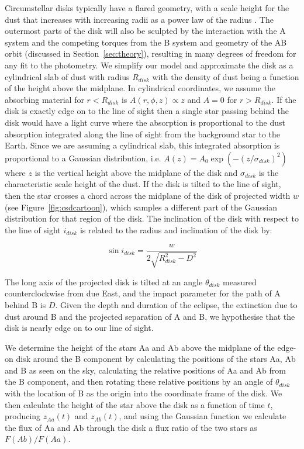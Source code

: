 \documentclass{aa}
\begin{document}
Circumstellar disks typically have a flared geometry, with a scale height for the dust that increases with increasing radii as a power law of the radius \citep{Dullemond02}.
%
The outermost parts of the disk will also be sculpted by the interaction with the A system and the competing torques from the B system and geometry of the AB orbit (discussed in Section~\ref{sec:theory}), resulting in many degrees of freedom for any fit to the photometry.
%
We simplify our model and approximate the disk as a cylindrical slab of dust with radius $R_{disk}$ with the density of dust being a function of the height above the midplane.
%
In cylindrical coordinates, we assume the absorbing material for $r<R_{disk}$ is $A(r,\phi,z)\propto z$ and $A=0$ for $r>R_{disk}$.
%
If the disk is exactly edge on to the line of sight then a single star passing behind the disk would have a light curve where the absorption is proportional to the dust absorption integrated along the line of sight from the background star to the Earth.
%
Since we are assuming a cylindrical slab, this integrated absorption is proportional to a Gaussian distribution, i.e. $A(z) = A_0 \exp(-(z/\sigma_{disk})^2)$ where $z$ is the vertical height above the midplane of the disk and $\sigma_{disk}$ is the characteristic scale height of the dust.
%
If the disk is tilted to the line of sight, then the star crosses a chord across the midplane of the disk of projected width $w$ (see Figure~\ref{fig:csdcartoon}), which samples a different part of the Gaussian distribution for that region of the disk.
%
The inclination of the disk with respect to the line of sight $i_{disk}$ is related to the radius and inclination of the disk by:

$$\sin i_{disk} = \frac{w}{2\sqrt{R_{disk}^2-D^2}} $$

The long axis of the projected disk is tilted at an angle $\theta_{disk}$\degr{} measured counterclockwise from due East, and the impact parameter for the path of A behind B is $D$.
%
Given the depth and duration of the eclipse, the extinction due to dust around B and the projected separation of A and B, we hypothesise that the disk is nearly edge on to our line of sight.

We determine the height of the stars Aa and Ab above the midplane of the edge-on disk around the B component by calculating the positions of the stars Aa, Ab and B as seen on the sky, calculating the relative positions of Aa and Ab from the B component, and then rotating these relative positions by an angle of $\theta_{disk}$ with the location of B as the origin into the coordinate frame of the disk.
%
We then calculate the height of the star above the disk as a function of time $t$, producing $z_{Aa}(t)$ and $z_{Ab}(t)$, and using the Gaussian function we calculate the flux of Aa and Ab through the disk a flux ratio of the two stars as $F(Ab)/F(Aa)$.
\end{document}
